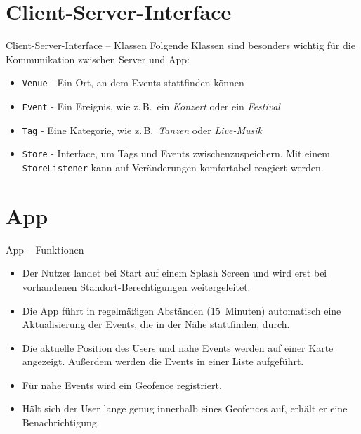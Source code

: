 \documentclass{beamer}
\begin{document}
	\section{Client-Server-Interface}
	\begin{frame}{Client-Server-Interface -- Klassen}
		Folgende Klassen sind besonders wichtig für die Kommunikation zwischen Server und App:
		\begin{itemize}
			\item \texttt{Venue} - Ein Ort, an dem Events stattfinden können
			\item \texttt{Event} - Ein Ereignis, wie z.\,B.\ ein \textit{Konzert} oder ein \textit{Festival}
			\item \texttt{Tag} - Eine Kategorie, wie z.\,B.\ \textit{Tanzen} oder \textit{Live-Musik}
			\item \texttt{Store} - Interface, um Tags und Events zwischenzuspeichern. Mit einem \texttt{StoreListener} kann auf Veränderungen komfortabel reagiert werden.
		\end{itemize}
	\end{frame}
	
	
	\section{App}
	\begin{frame}{App -- Funktionen}
		\begin{itemize}
			\item Der Nutzer landet bei Start auf einem \alert<1>{Splash Screen} und wird erst bei vorhandenen Standort-Berechtigungen weitergeleitet.
			\item Die App führt in regelmäßigen Abständen (15~Minuten) automatisch eine \alert<2>{Aktualisierung} der Events, die in der Nähe stattfinden, durch.
			\item Die aktuelle Position des Users und nahe Events werden auf einer \alert<3>{Karte} angezeigt. Außerdem werden die Events in einer Liste aufgeführt.
			\item Für nahe Events wird ein \alert<4>{Geofence} registriert.
			\item Hält sich der User lange genug innerhalb eines Geofences auf, erhält er eine \alert<5>{Benachrichtigung}.
		\end{itemize}
	\end{frame}
\end{document}
